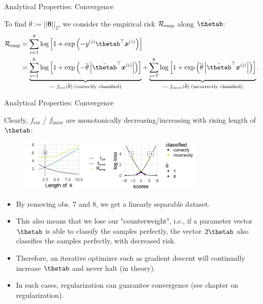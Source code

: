 \begin{vbframe}{Analytical Properties: Convergence}
\medskip

To find $\overline{\theta} := ||\bm{\theta}||_2$, we consider the empirical risk $\mathcal{R}_{\text{emp}}$ along $\tilde\thetab$:
\begin{align*}
\riske &= \sum^8_{i=1} \log \left[1 + \exp \left(-y^{(i)}\thetab^\top \xv^{(i)}\right)\right] \\
&= \underbrace{\sum^6_{i=1} \log \left[1 + \exp \left(- \overline{\theta} \left|\tilde{\thetab}^\top \xv^{(i)}\right|\right)\right]}_{=: \; f_{\text{cor}}(\overline{\theta}) \;\text{(correctly classified)}} +
\underbrace{\sum^8_{i=7}\log \left[1 + \exp \left( \overline{\theta} \left| \tilde{\thetab}^\top \xv^{(i)}\right|\right)\right]}_{=:\; f_{\text{incor}}(\overline{\theta}) \;\text{(incorrectly classified)}}.
\end{align*}

\end{vbframe}


\begin{vbframe}{Analytical Properties: Convergence}

Clearly, $f_{\text{cor}}$ / $f_{\text{incor}}$ are monotonically decreasing/increasing with rising length of $\thetab$:

\begin{figure}
\includegraphics[width=0.8\textwidth]{figure_man/undet-problem02.png}\\
\end{figure}

\begin{itemize}
\item By removing obs. 7 and 8, we get a linearly separable dataset. \\
\item This also means that we lose our "counterweight", i.e., if a parameter vector $\thetab$ is able to classify the samples perfectly, the vector $2\thetab$ also classifies the samples perfectly, with decreased risk.
\item Therefore, an iterative optimizer such as gradient descent will continually increase $\thetab$ and never halt (in theory).
\item In such cases, regularization can guarantee convergence (see chapter on regularization). 
\end{itemize}

\end{vbframe}

